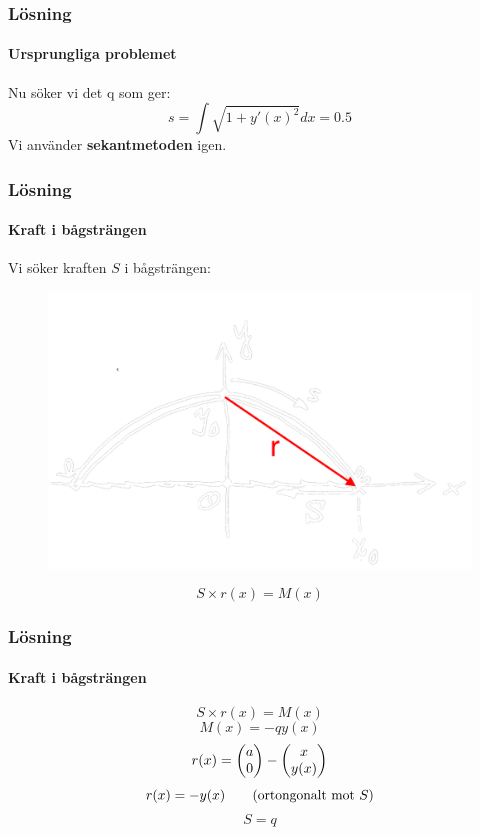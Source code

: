 \documentclass[xcolor=dvipsnames]{beamer}
\newcommand*\colvec[3][]{
    \begin{pmatrix}\ifx\relax#1\relax\else#1\\\fi#2\\#3\end{pmatrix}
}
\begin{document}
\begin{frame}
\frametitle{Lösning}
\framesubtitle{Ursprungliga problemet}
Nu söker vi det q som ger:
\begin{equation}
s = \int{\sqrt{1+y'(x)^2}}{dx}=0.5 \nonumber
\end{equation}
Vi använder \textbf{sekantmetoden} igen.
\end{frame}

\begin{frame}
\frametitle{Lösning}
\framesubtitle{Kraft i bågsträngen}
Vi söker kraften $S$ i bågsträngen:
\begin{figure}[h!]
\centering
\includegraphics[scale=0.2]{moment.png}
\end{figure}
\begin{equation}
	S \times r(x) = M(x)\nonumber
\end{equation}
\end{frame}

\begin{frame}
\frametitle{Lösning}
\framesubtitle{Kraft i bågsträngen}
\begin{equation}
	S \times r(x) = M(x)\nonumber
\end{equation}
\begin{equation}
	M(x) = -qy(x) \nonumber
\end{equation}
\begin{equation}
	r(x) = \colvec{a}{0} - \colvec{x}{y(x)} \nonumber
\end{equation}
\begin{equation}
	r(x) = -y(x) \quad\quad \textnormal{(ortongonalt mot $S$)} \nonumber
\end{equation}
\begin{equation}
	S = q \nonumber
\end{equation}
\end{frame}
\end{document}

